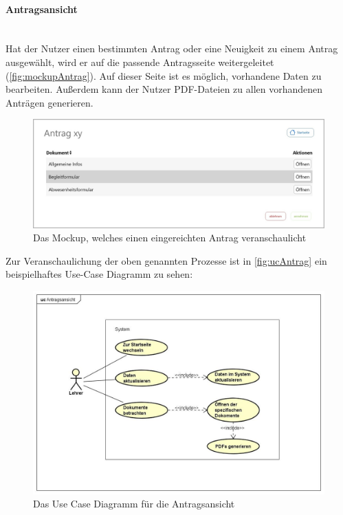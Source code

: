 \paragraph{Antragsansicht}
~\\
Hat der Nutzer einen bestimmten Antrag oder eine Neuigkeit zu einem Antrag ausgewählt, wird er auf die passende Antragsseite weitergeleitet (\autoref{fig:mockupAntrag}). Auf dieser Seite ist es möglich, vorhandene Daten zu bearbeiten. Außerdem kann der Nutzer PDF-Dateien zu allen vorhandenen Anträgen generieren.
\begin{figure}[H]
	\centering
	\includegraphics[width=1\linewidth]{images/ldehner_konzept/Mockup-Antragsansicht}
	\caption[Mockup Antragsansicht]{Das Mockup, welches einen eingereichten Antrag veranschaulicht}
	\label{fig:mockupAntrag}
\end{figure}
Zur Veranschaulichung der oben genannten Prozesse ist in \autoref{fig:ucAntrag} ein beispielhaftes Use-Case Diagramm zu sehen: 
\begin{figure}[H]
	\centering
	\includegraphics[width=1\linewidth]{images/ldehner_konzept/uc-antrag}
	\caption[Use Case Diagramm Antragsansicht]{Das Use Case Diagramm für die Antragsansicht}
	\label{fig:ucAntrag}
\end{figure}